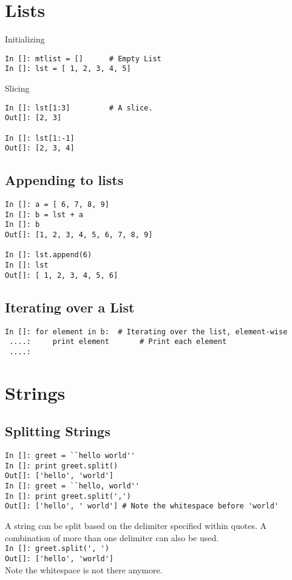 \documentclass[12pt]{article}
\newcommand{\typ}[1]{\lstinline{#1}}
\begin{document}
\section{Lists}

Initializing
  \begin{lstlisting}
In []: mtlist = []      # Empty List
In []: lst = [ 1, 2, 3, 4, 5] 
  \end{lstlisting}
Slicing
\begin{lstlisting}
In []: lst[1:3]         # A slice.
Out[]: [2, 3]

In []: lst[1:-1]
Out[]: [2, 3, 4]
\end{lstlisting}
\subsection{Appending to lists}
\begin{lstlisting}
In []: a = [ 6, 7, 8, 9]
In []: b = lst + a
In []: b
Out[]: [1, 2, 3, 4, 5, 6, 7, 8, 9]

In []: lst.append(6)
In []: lst
Out[]: [ 1, 2, 3, 4, 5, 6]
\end{lstlisting}
\subsection{Iterating over a List}
\begin{lstlisting}
In []: for element in b:  # Iterating over the list, element-wise
 ....:     print element       # Print each element
 ....:
\end{lstlisting}

\section{Strings}
\subsection{Splitting Strings}
\begin{lstlisting}
In []: greet = ``hello world''
In []: print greet.split()
Out[]: ['hello', 'world']
In []: greet = ``hello, world''
In []: print greet.split(',')
Out[]: ['hello', ' world'] # Note the whitespace before 'world'
\end{lstlisting}
A string can be split based on the delimiter specified within quotes. A combination of more than one delimiter can also be used.\\
\typ{In []: greet.split(', ')}\\
\typ{Out[]: ['hello', 'world']}\\Note the whitespace is not there anymore.
\end{document}
